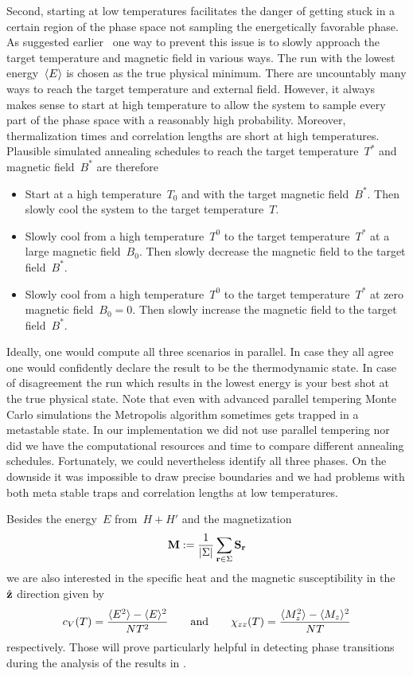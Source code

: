 Second, starting at low temperatures facilitates the danger of getting stuck in
a certain region of the phase space not sampling the energetically favorable
phase. As suggested earlier~\cite{skyrmion} one way to prevent this issue is to
slowly approach the target temperature and magnetic field in various ways. The
run with the lowest energy~$\langle E \rangle$ is chosen as the true physical minimum.
There are uncountably many ways to reach the target temperature and external
field. However, it always makes sense to start at high temperature to allow the
system to sample every part of the phase space with a reasonably high
probability. Moreover, thermalization times and correlation lengths are short at
high temperatures. Plausible simulated annealing schedules to reach the target
temperature~$T^*$ and magnetic field~$B^*$ are therefore

\begin{itemize}
  \item Start at a high temperature~$T_0$ and with the target magnetic
    field~$B^*$. Then slowly cool the system to the target temperature~$T$.
  \item Slowly cool from a high temperature~$T^0$ to the target
    temperature~$T^*$ at a large magnetic field~$B_0$. Then slowly decrease the
    magnetic field to the target field~$B^*$.
  \item Slowly cool from a high temperature~$T^0$ to the target
    temperature~$T^*$ at zero magnetic field~$B_0=0$. Then slowly increase the
    magnetic field to the target field~$B^*$.
\end{itemize}

Ideally, one would compute all three scenarios in parallel. In case they all
agree one would confidently declare the result to be the thermodynamic state. In
case of disagreement the run which results in the lowest energy is your best
shot at the true physical state. Note that even with advanced parallel tempering
Monte Carlo simulations the Metropolis algorithm sometimes gets trapped in a
metastable state. In our implementation we did not use parallel tempering nor
did we have the computational resources and time to compare different annealing
schedules. Fortunately, we could nevertheless identify all three phases. On the
downside it was impossible to draw precise boundaries and we had problems with
both meta stable traps and correlation lengths at low temperatures.

Besides the energy~$E$ from~$H + H'$ and the magnetization
%
\begin{equation}
  \M := \frac{1}{\abs{\Sigma}} \sum_{\r \in \Sigma} \S_{\r}
\end{equation}
%
we are also interested in the specific heat and the magnetic susceptibility in
the~$\hat{\mathbf{z}}$ direction given by
%
\begin{equation}\label{heatsusc}
  c_V (T) = \frac{\langle E^2 \rangle - \langle E \rangle^2}{N T^2} \qquad\text{and}\qquad
  \chi_{zz} (T) = \frac{\langle M_z^2 \rangle - \langle M_z \rangle^2}{N T}
\end{equation}
%
respectively. Those will prove particularly helpful in detecting phase
transitions during the analysis of the results in .

